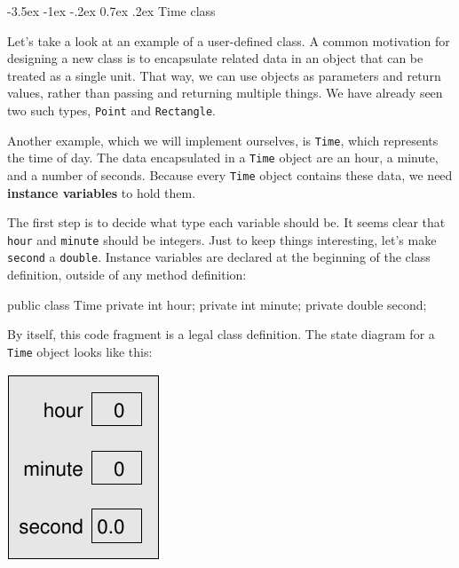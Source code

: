 \documentclass[12pt]{book}
\makeatletter
\renewcommand{\section}{\@startsection {section}{1}{\z@}%
    {-3.5ex \@plus -1ex \@minus -.2ex}%
    {0.7ex \@plus.2ex}%
    {\normalfont\Large\bfseries}}
\theoremstyle{exercise}
\newcommand{\java}[1]{\lstinline{#1}} %
\makeatother
\begin{document}
\section{Time class}


Let's take a look at an example of a user-defined class.
A common motivation for designing a new class is to encapsulate related data in an object that can be treated as a single unit.
That way, we can use objects as parameters and return values, rather than passing and returning multiple things.
We have already seen two such types, \java{Point} and \java{Rectangle}.


Another example, which we will implement ourselves, is \java{Time}, which represents the time of day.
The data encapsulated in a \java{Time} object are an hour, a minute, and a number of seconds.
Because every \java{Time} object contains these data, we need {\bf instance variables} to hold them.

The first step is to decide what type each variable should be.
It seems clear that \java{hour} and \java{minute} should be integers.
Just to keep things interesting, let's make \java{second} a \java{double}.
Instance variables are declared at the beginning of the class definition, outside of any method definition:

\begin{code}
public class Time {
    private int hour;
    private int minute;
    private double second;
}
\end{code}

By itself, this code fragment is a legal class definition.
The state diagram for a \java{Time} object looks like this:

\begin{center}
\includegraphics{figs/time.pdf}
\end{center}
\end{document}
